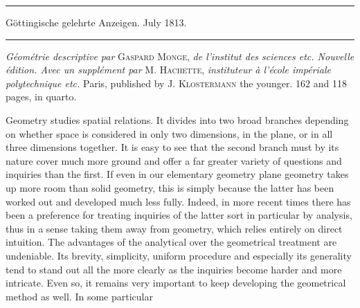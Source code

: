\begin{center}
\rule{.85\textwidth}{.3pt}\par
Göttingische gelehrte Anzeigen. July 1813.\par
\rule{.85\textwidth}{.3pt}
\end{center}
\hspace*{\parindent}\textit{Géométrie descriptive par} \textsc{Gaspard Monge}, \textit{de l’institut des sciences etc. Nouvelle édition. Avec un supplément par} \textsc{M. Hachette}, \textit{instituteur à l’école impériale polytechnique etc.} Paris, published by \textsc{J. Klostermann} the younger. 162 and 118 pages, in quarto.

Geometry studies spatial relations. It divides into two broad branches depending on whether space is considered in only two dimensions, in the plane, or in all three dimensions together. It is easy to see that the second branch must by its nature cover much more ground and offer a far greater variety of questions and inquiries than the first. If even in our elementary geometry plane geometry takes up more room than solid geometry, this is simply because the latter has been worked out and developed much less fully. Indeed, in more recent times there has been a preference for treating inquiries of the latter sort in particular by analysis, thus in a sense taking them away from geometry, which relies entirely on direct intuition. The advantages of the analytical over the geometrical treatment are undeniable. Its brevity, simplicity, uniform procedure and especially its generality tend to stand out all the more clearly as the inquiries become harder and more intricate. Even so, it remains very important to keep developing the geometrical method as well. In some particular %
